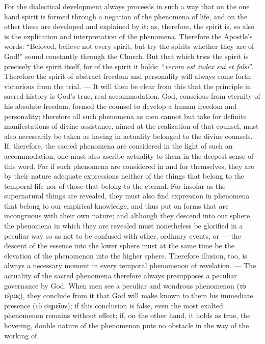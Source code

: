 \documentclass[12pt]{book}
\newcommand{\opage}[1]{\marginnote{\footnotesize\textit{[#1]}}}
\begin{document}
For the dialectical development always proceeds in such a way that on the one
hand spirit is formed through a negation of the phenomena of life, and on the
other these are developed and explained by it; as, therefore, the spirit is, so
also is the explication and interpretation of the phenomena. Therefore the
Apostle's words: ``Beloved, believe not every spirit, but try the spirits
whether they are of God!'' sound constantly through the Church. But that which
tries the spirit is precisely the spirit itself, for of the spirit it holds:
``\textit{verum est index sui et falsi}''. Therefore the spirit of abstract
freedom and personality will always come forth victorious from the trial. ---
It will then be clear from this that the principle in sacred history is God's
true, real accommodation. God, conscious from eternity
\opage{157} %
of his absolute freedom, formed the counsel to develop a human freedom and
personality; therefore all such phenomena as men cannot but take for definite
manifestations of divine assistance, aimed at the realization of that counsel,
must also necessarily be taken as having in actuality belonged to the divine
counsels. If, therefore, the sacred phenomena are considered in the light of such
an accommodation, one must also ascribe actuality to them in the deepest sense of
this word. For if such phenomena are considered in and for themselves, they are
by their nature adequate expressions neither of the things that belong to the
temporal life nor of those that belong to the eternal. For insofar as the
supernatural things are revealed, they must also find expression in phenomena
that belong to our empirical knowledge, and thus put on forms that are
incongruous with their own nature; and although they descend into our sphere,
the phenomena in which they are revealed must nonetheless be glorified in a
peculiar way so as not to be confused with other, ordinary events, or --- the
descent of the essence into the lower sphere must at the same time be the
elevation of the phenomenon into the higher sphere. Therefore illusion, too, is
always a necessary moment in every temporal phenomenon of revelation. --- The
actuality of the sacred phenomena therefore always presupposes a peculiar
governance by God. When men see a peculiar and wondrous phenomenon (τὸ τέρας),
they conclude from it that God will make known to them his immediate presence
(τὸ σημεῖον); if this conclusion is false, even the most exalted phenomenon
remains without effect; if, on the other hand, it holds as true, the hovering,
double nature of the phenomenon puts no obstacle in the way of the working of
\end{document}
